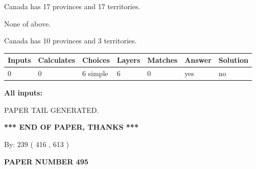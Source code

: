 \documentclass[12pt]{article}
\begin{document}
 
Canada has  17 provinces and  17 territories.
 
 
 None of above.
 
 
\noindent{}
 
 
Canada has 10  provinces and 3 territories.
 
 
\noindent{}
 
 
   
   
   
   
\noindent\begin{tabular}{|l|l|l|l|l|l|l|}
 \hline
Inputs & Calculates & Choices & Layers & Matches & Answer & Solution \\ \hline
 0  & 
 0  & 
 6
  simple  
  & 
 6  & 
 0  & 
  yes & 
  no 
  \\ \hline
 \end{tabular}
   
   
   
   
\noindent{}
   
   
   
   
\noindent\vspace{0.1in}\hspace{-0.08in} {\textbf{\Large{All inputs: }}}
   
   
   
   
   
   
 \vspace{0.2in}
 
   
   
\vspace{2.0in} PAPER TAIL GENERATED.
   
   
   
   
\vspace{1.0in} 
{\textbf{\large{ *** END OF PAPER, THANKS *** }}} 
   
   
\hspace{1.0in} By: 
 239 ( 416 ,  613 )
   
   
   
   
\newpage 
\setcounter{page}{ 
   495001 } 
   
   
   
   
 {\textbf{ \Large{ PAPER NUMBER  495  }}}
   
\end{document}

